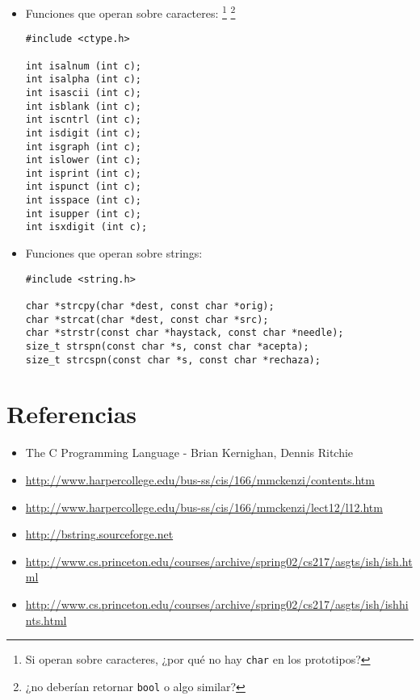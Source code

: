 \documentclass[12pt,a4paper,spanish]{article}
\begin{document}
\begin{itemize}

\item Funciones que operan sobre caracteres: \footnote{Si operan sobre
caracteres, ¿por qué no hay \texttt{char} en los prototipos?}
\footnote{¿no deberían retornar \texttt{bool} o algo similar?}

\begin{verbatim}
#include <ctype.h>

int isalnum (int c);
int isalpha (int c);
int isascii (int c);
int isblank (int c);
int iscntrl (int c);
int isdigit (int c);
int isgraph (int c);
int islower (int c);
int isprint (int c);
int ispunct (int c);
int isspace (int c);
int isupper (int c);
int isxdigit (int c);
\end{verbatim}

\item Funciones que operan sobre strings:

\begin{verbatim}
#include <string.h>

char *strcpy(char *dest, const char *orig);
char *strcat(char *dest, const char *src);
char *strstr(const char *haystack, const char *needle);
size_t strspn(const char *s, const char *acepta);
size_t strcspn(const char *s, const char *rechaza);
\end{verbatim}

\end{itemize}

\section*{Referencias}

\begin{itemize}
\item The \textsf{C} Programming Language - Brian Kernighan, Dennis Ritchie
\item \url{http://www.harpercollege.edu/bus-ss/cis/166/mmckenzi/contents.htm}
\item \url{http://www.harpercollege.edu/bus-ss/cis/166/mmckenzi/lect12/l12.htm}
\item \url{http://bstring.sourceforge.net}
\item \url{http://www.cs.princeton.edu/courses/archive/spring02/cs217/asgts/ish/ish.html}
\item \url{http://www.cs.princeton.edu/courses/archive/spring02/cs217/asgts/ish/ishhints.html}
\end{itemize}
\end{document}

